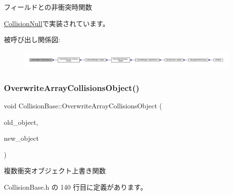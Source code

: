 フィールドとの非衝突時関数 



\mbox{\hyperlink{class_collision_null_ad456a03a3e3d55d8d408b7ed28ce7911}{Collision\+Null}}で実装されています。

被呼び出し関係図\+:
\nopagebreak
\begin{figure}[H]
\begin{center}
\leavevmode
\includegraphics[width=350pt]{class_collision_base_ac1ed5b1c0c9b6b70b432e6656f9c4b45_icgraph}
\end{center}
\end{figure}
\mbox{\label{class_collision_base_a4a7bba0fc9d39e27dc58d695f04cf186}} 
\subsubsection{\texorpdfstring{Overwrite\+Array\+Collisions\+Object()}{OverwriteArrayCollisionsObject()}}
{\footnotesize\ttfamily void Collision\+Base\+::\+Overwrite\+Array\+Collisions\+Object (\begin{DoxyParamCaption}\item[{\mbox{\hyperlink{class_collision_objects}{Collision\+Objects}} $\ast$}]{old\+\_\+object,  }\item[{\mbox{\hyperlink{class_collision_objects}{Collision\+Objects}} $\ast$}]{new\+\_\+object }\end{DoxyParamCaption})\hspace{0.3cm}{\ttfamily [inline]}}



複数衝突オブジェクト上書き関数 



 Collision\+Base.\+h の 140 行目に定義があります。

